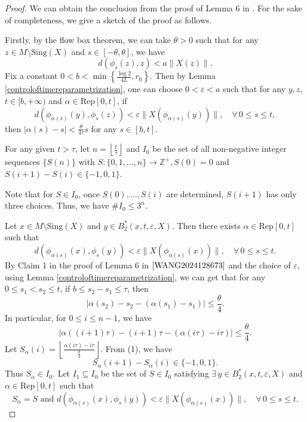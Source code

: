 \documentclass[10pt]{article}
\newtheorem*{Theorem A}{Theorem A}
\begin{document}
\noindent
\begin{proof}  We can obtain the conclusion from the proof of Lemma 6 in \cite{WANG2024128673}. For the sake of completeness, we give a sketch of the proof as follows.

Firstly, by the flow box theorem, we can take \( \theta > 0 \) such that for any \( z \in M \setminus\text{Sing}(X) \) and \( s \in [-\theta,\theta] \), we have
\[
d(\phi_s(z), z) < a \|X(z)\|.
\]
Fix a constant \( 0 < b < \min\left\{ \frac{\log 2}{4L}, r_0 \right\} \). Then by Lemma \ref{controloftimereparametrization}, one can choose \( 0 < \varepsilon < a \) such that for any \( y, z \), \( t \in [b, +\infty) \) and \( \alpha \in \text{Rep}[0, t] \), if
\[
d(\phi_{\alpha(s)}(y), \phi_s(z)) < \varepsilon \|X(\phi_{\alpha(s)}(y))\|, \quad \forall \, 0 \leq s \leq t,
\]
then \( |\alpha(s) - s| < \frac{\theta}{4\tau}s \) for any \( s \in [b, t] \).

For any given \(t>\tau \), let \( n = \left\lfloor \frac{t}{\tau} \right\rfloor \) and  \( I_0 \) be the set of all non-negative integer sequences \(\{S(n)\}\) with \( S: \{0, 1, \dots, n\} \to \mathbb{Z}^+ \),\,\( S(0) = 0 \) and \( S(i+1) - S(i)\in\{-1, 0, 1\}\).

 Note that for \(S\in I_0 \), once \( S(0), \ldots, S(i) \) are determined, \( S(i + 1) \) has only three choices. Thus, we have \( \#I_0 \leq 3^n \).

Let \( x \in M \setminus \text{Sing}(X) \) and \( y \in B_2^*(x, t, \varepsilon, X) \). Then there exists \( \alpha \in \text{Rep}[0, t] \) such that
\[
d(\phi_{\alpha(s)}(x), \phi_s(y)) < \varepsilon \|X(\phi_{\alpha(s)}(x))\|, \quad \forall \,0\leq s \leq t.
\]
By Claim 1 in the proof of Lemma 6 in \(\cite{WANG2024128673}\) and the choice of \( \varepsilon \), using Lemma \ref{controloftimereparametrization}, we can get that for any \( 0 \leq s_1 < s_2 \leq t \), if \( b \leq s_2 - s_1 \leq \tau \), then \[
|\alpha(s_2) - s_2 - (\alpha(s_1) - s_1)| \leq \frac{\theta}{4}.
\]
In particular, for \( 0 \leq i \leq n - 1 \), we have
\[
\left| \alpha((i + 1)\tau) - (i + 1)\tau - (\alpha(i\tau) - i\tau) \right| \leq \frac{\theta}{4}. \tag{1}
\]
Let \( S_\alpha(i) = \left\lfloor \frac{\alpha(i\tau) - i\tau}{\frac{\theta}{4}} \right\rfloor \). From (1), we have
\[
S_\alpha(i+1) - S_\alpha(i) \in \{-1, 0, 1\}.
\]
Thus \( S_\alpha \in I_0 \). Let \( I_1 \subseteq I_0 \) be the set of \( S \in I_0 \) satisfying \(\exists\, y \in B_2^*(x, t, \varepsilon, X) \) and \( \alpha \in \text{Rep}[0, t] \) such that
\[
S_{\alpha} = S  \text{   and   }
d(\phi_{\alpha(s)}(x), \phi_s(y)) < \varepsilon \|X(\phi_{\alpha(s)}(x))\|, \quad \forall\,0\leq s \leq t   .
\]


\end{proof}
\end{document}
